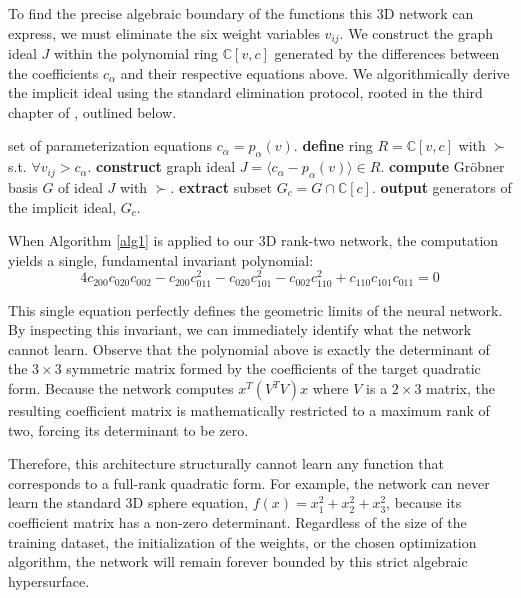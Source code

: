 To find the precise algebraic boundary of the functions this 3D network can express, we must eliminate the six weight variables $v_{ij}$. We construct the graph ideal $J$ within the polynomial ring $\mathbb{C}[v, c]$ generated by the differences between the coefficients $c_\alpha$ and their respective equations above. We algorithmically derive the implicit ideal using the standard elimination protocol, rooted in the third chapter of \cite{cox2015IVA}, outlined below.

\begin{algorithm}
\caption{Implicitization via Gröbner Basis Elimination}
\label{alg1}
\begin{algorithmic}
\Input set of parameterization equations $c_\alpha = p_\alpha(v)$.
\State \textbf{define} ring $R = \mathbb{C}[v, c]$ with $\succ$ s.t. $\forall v_{ij} > c_\alpha$.
\State \textbf{construct} graph ideal $J = \langle c_\alpha - p_\alpha(v) \rangle \in R$.
\State \textbf{compute} Gröbner basis $G$ of ideal $J$ with $\succ$. 
\State \textbf{extract} subset $G_c = G \cap \mathbb{C}[c]$.
\State \textbf{output} generators of the implicit ideal, $G_c$.
\end{algorithmic}
\end{algorithm}

When Algorithm \ref{alg1} is applied to our 3D rank-two network, the computation yields a single, fundamental invariant polynomial:
\[
4c_{200}c_{020}c_{002} - c_{200}c_{011}^2 - c_{020}c_{101}^2 - c_{002}c_{110}^2 + c_{110}c_{101}c_{011} = 0
\]

This single equation perfectly defines the geometric limits of the neural network. By inspecting this invariant, we can immediately identify what the network cannot learn. Observe that the polynomial above is exactly the determinant of the $3 \times 3$ symmetric matrix formed by the coefficients of the target quadratic form. Because the network computes $x^T (V^T V) x$ where $V$ is a $2 \times 3$ matrix, the resulting coefficient matrix is mathematically restricted to a maximum rank of two, forcing its determinant to be zero. 

Therefore, this architecture structurally cannot learn any function that corresponds to a full-rank quadratic form. For example, the network can never learn the standard 3D sphere equation, $f(x) = x_1^2 + x_2^2 + x_3^2$, because its coefficient matrix has a non-zero determinant. Regardless of the size of the training dataset, the initialization of the weights, or the chosen optimization algorithm, the network will remain forever bounded by this strict algebraic hypersurface.

